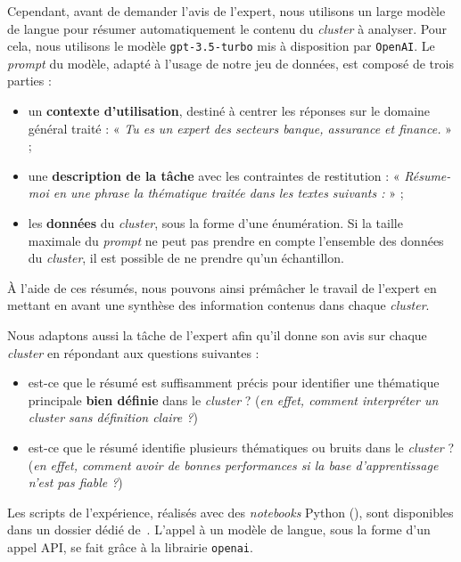 			Cependant, avant de demander l'avis de l'expert, nous utilisons un large modèle de langue pour résumer automatiquement le contenu du \textit{cluster} à analyser.
			Pour cela, nous utilisons le modèle \texttt{gpt-3.5-turbo} mis à disposition par \texttt{OpenAI}.
			Le \textit{prompt} du modèle, adapté à l'usage de notre jeu de données, est composé de trois parties :
			\begin{itemize}
				\item un \textbf{contexte d'utilisation}, destiné à centrer les réponses sur le domaine général traité : « \textit{Tu es un expert des secteurs banque, assurance et finance.} » ;
				\item une \textbf{description de la tâche} avec les contraintes de restitution : « \textit{Résume-moi en une phrase la thématique traitée dans les textes suivants :} » ;
				\item les \textbf{données} du \textit{cluster}, sous la forme d'une énumération. Si la taille maximale du \textit{prompt} ne peut pas prendre en compte l'ensemble des données du \textit{cluster}, il est possible de ne prendre qu'un échantillon.
			\end{itemize}
			À l'aide de ces résumés, nous pouvons ainsi prémâcher le travail de l'expert en mettant en avant une synthèse des information contenus dans chaque \textit{cluster}.
			
			Nous adaptons aussi la tâche de l'expert afin qu'il donne son avis sur chaque \textit{cluster} en répondant aux questions suivantes :
			\begin{itemize}
				\item est-ce que le résumé est suffisamment précis pour identifier une thématique principale \textbf{bien définie} dans le \textit{cluster} ? (\textit{en effet, comment interpréter un cluster sans définition claire ?})
				\item est-ce que le résumé identifie plusieurs thématiques ou bruits dans le \textit{cluster} ? (\textit{en effet, comment avoir de bonnes performances si la base d'apprentissage n'est pas fiable ?})
			\end{itemize}
			
			\begin{leftBarInformation}
				Les scripts de l'expérience, réalisés avec des \textit{notebooks} Python (\cite{van-rossum-drake:2009:python-reference-manual}), sont disponibles dans un dossier dédié de~\cite{schild:2021:cognitivefactory-interactiveclusteringcomparativestudy}.
				L'appel à un modèle de langue, sous la forme d'un appel API, se fait grâce à la librairie \texttt{openai}.
			\end{leftBarInformation}

